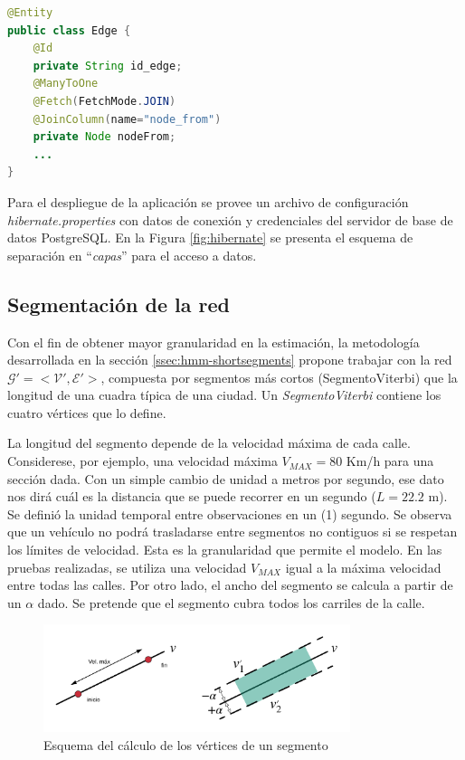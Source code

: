 \begin{lstlisting}[language=Java, caption=Mapeo objeto-relacional de la entidad Edge en Hibernate, label=alg:ej-hibernate-edge]
@Entity
public class Edge {
	@Id
	private String id_edge;
	@ManyToOne
	@Fetch(FetchMode.JOIN)
	@JoinColumn(name="node_from")
	private Node nodeFrom;
	...
}
\end{lstlisting}


Para el despliegue de la aplicación se provee un archivo de configuración \textit{hibernate.properties} con datos de conexión y credenciales del servidor de base de datos PostgreSQL.  En la Figura \ref{fig:hibernate} se presenta el esquema de separación en ``\textit{capas}'' para el acceso a datos.

\subsection{Segmentación de la red}

Con el fin de obtener mayor granularidad en la estimación, la metodología desarrollada en la sección \ref{ssec:hmm-shortsegments} propone trabajar con la red \(\mathcal{G'=<V',E'>}\), compuesta por segmentos más cortos (SegmentoViterbi) que la longitud de una cuadra típica de una ciudad. Un \textit{SegmentoViterbi} contiene los cuatro vértices que lo define.

La longitud del segmento depende de la velocidad máxima de cada calle. Considerese, por ejemplo, una velocidad máxima $V_{MAX} = 80$ Km/h para una sección dada. Con un simple cambio de unidad a metros por segundo, ese dato nos dirá cuál es la distancia que se puede recorrer en un segundo ($L=22.2$ m). Se definió la unidad temporal entre observaciones en un (1) segundo. Se observa que un vehículo no podrá trasladarse entre segmentos no contiguos si se respetan los límites de velocidad. Esta es la granularidad que permite el modelo. En las pruebas realizadas, se utiliza una velocidad $V_{MAX}$ igual a la máxima velocidad entre todas las calles. Por otro lado, el ancho del segmento se calcula a partir de un $\alpha$ dado. Se pretende que el segmento cubra todos los carriles de la calle.

\begin{figure}[!htp]
	\centering
	\includegraphics[width=0.8\textwidth]{images/segmentacion_mapa.png}
	\caption{Esquema del cálculo de los vértices de un segmento}
    \label{fig:segmentacion-mapa}
\end{figure}


